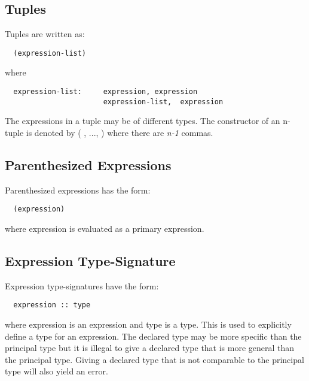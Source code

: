 \subsection{Tuples}
Tuples are written as:
  \begin{verbatim}
  (expression-list)\end{verbatim}
  where
  \begin{verbatim}
  expression-list:     expression, expression
                       expression-list,  expression \end{verbatim}
The expressions in a tuple may be of different types. The constructor of an n-tuple is denoted by (\textunderscore
, ..., \textunderscore) where there are \textit{n-1} commas.

\subsection{Parenthesized Expressions}
Parenthesized expressions has the form:
  \begin{verbatim}
  (expression)\end{verbatim}
  where expression is evaluated as a primary expression.

\subsection{Expression Type-Signature}
Expression type-signatures have the form:
  \begin{verbatim}
  expression :: type \end{verbatim}
  where expression is an expression and type is a type. This is used to explicitly define a type for an expression. The declared type may be more specific than the principal type but it is illegal to give a declared type that is more general than the principal type. Giving a declared type that is not comparable to the principal type will also yield an error.
